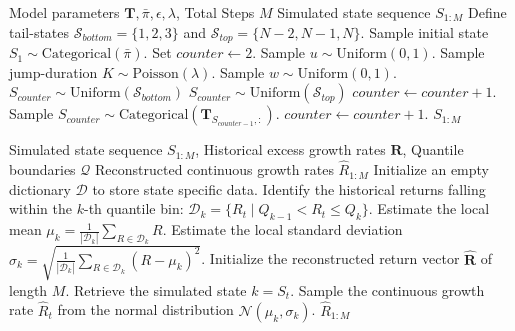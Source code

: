 \documentclass[11pt, letterpaper]{article}
\begin{document}
\begin{algorithm}[htpb]
\caption{Hybrid jump-diffusion simulation with persistent volatility}
\label{alg:sim}
\begin{algorithmic}[1]
\REQUIRE Model parameters $\mathbf{T}, \bar{\pi}, \epsilon, \lambda$, Total Steps $M$
\ENSURE Simulated state sequence $S_{1:M}$
\STATE Define tail-states $\mathcal{S}_{bottom} = \{1, 2, 3\}$ and $\mathcal{S}_{top} = \{N-2, N-1, N\}$.
\STATE Sample initial state $S_1 \sim \text{Categorical}(\bar{\pi})$.
\STATE Set $counter \leftarrow 2$.
    \STATE Sample $u \sim \text{Uniform}(0, 1)$.
        \STATE Sample jump-duration $K \sim \text{Poisson}(\lambda)$.
            \STATE Sample $w \sim \text{Uniform}(0, 1)$.
                \STATE {}
                \STATE $S_{counter} \sim \text{Uniform}(\mathcal{S}_{bottom})$ 
            \ELSE
                \STATE $S_{counter} \sim \text{Uniform}(\mathcal{S}_{top})$ 
            \ENDIF
            \STATE $counter \leftarrow counter + 1$.
        \ENDFOR
    \ELSE
        \STATE Sample $S_{counter} \sim \text{Categorical}(\mathbf{T}_{S_{counter-1}, :})$.
        \STATE $counter \leftarrow counter + 1$.
    \ENDIF
\ENDWHILE
\RETURN $S_{1:M}$
\end{algorithmic}
\end{algorithm}

\begin{algorithm}[htpb]
\caption{State decoding and continuous return reconstruction via MLE}
\label{alg:decode}
\begin{algorithmic}[1]
\REQUIRE Simulated state sequence $S_{1:M}$, Historical excess growth rates $\mathbf{R}$, Quantile boundaries $\mathcal{Q}$
\ENSURE Reconstructed continuous growth rates $\hat{R}_{1:M}$
\STATE Initialize an empty dictionary $\mathcal{D}$ to store state specific data.
    \STATE Identify the historical returns falling within the $k$-th quantile bin: $\mathcal{D}_k = \{R_t \mid Q_{k-1} < R_t \le Q_k\}$.
\STATE Estimate the local mean $\mu_k = \frac{1}{|\mathcal{D}_k|} \sum_{R \in \mathcal{D}_k} R$.
\STATE Estimate the local standard deviation $\sigma_k = \sqrt{\frac{1}{|\mathcal{D}_k|} \sum_{R \in \mathcal{D}_k} (R - \mu_k)^2}$.
\ENDFOR
\STATE Initialize the reconstructed return vector $\mathbf{\hat{R}}$ of length $M$.
    \STATE Retrieve the simulated state $k = S_t$.
\STATE Sample the continuous growth rate $\hat{R}_t$ from the normal distribution $\mathcal{N}(\mu_k, \sigma_k)$.
\ENDFOR
\RETURN $\hat{R}_{1:M}$
\end{algorithmic}
\end{algorithm}
\end{document}
